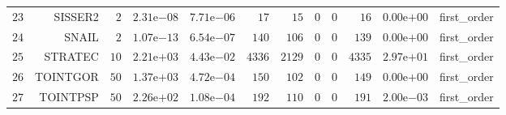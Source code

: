 \begin{longtable}{rrrrrrrrrrrr}
  \(    23\) & SISSER2 & \(     2\) & \( 2.31\)e\(-08\) & \( 7.71\)e\(-06\) & \(    17\) & \(    15\) & \(     0\) & \(     0\) & \(    16\) & \( 0.00\)e\(+00\) & first\_order \\
  \(    24\) & SNAIL & \(     2\) & \( 1.07\)e\(-13\) & \( 6.54\)e\(-07\) & \(   140\) & \(   106\) & \(     0\) & \(     0\) & \(   139\) & \( 0.00\)e\(+00\) & first\_order \\
  \(    25\) & STRATEC & \(    10\) & \( 2.21\)e\(+03\) & \( 4.43\)e\(-02\) & \(  4336\) & \(  2129\) & \(     0\) & \(     0\) & \(  4335\) & \( 2.97\)e\(+01\) & first\_order \\
  \(    26\) & TOINTGOR & \(    50\) & \( 1.37\)e\(+03\) & \( 4.72\)e\(-04\) & \(   150\) & \(   102\) & \(     0\) & \(     0\) & \(   149\) & \( 0.00\)e\(+00\) & first\_order \\
  \(    27\) & TOINTPSP & \(    50\) & \( 2.26\)e\(+02\) & \( 1.08\)e\(-04\) & \(   192\) & \(   110\) & \(     0\) & \(     0\) & \(   191\) & \( 2.00\)e\(-03\) & first\_order \\\hline
\end{longtable}
